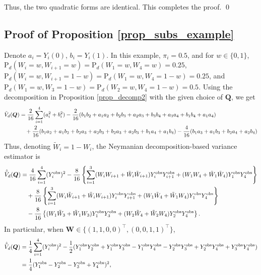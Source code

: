 \documentclass[12pt]{article}
\renewcommand{\Pr}{{\text{P}}}
\begin{document}
Thus, the two quadratic forms are identical. This completes the proof.
\qed
\subsection{Proof of Proposition \ref{prop_subs_example}}

Denote $a_i = Y_i(0)$, $b_i = Y_i(1)$. In this example, $\pi_i = 0.5$, and for $w \in \{0,1\}$, $\Pr_d(W_i = w, W_{i+1} = w) = \Pr_d(W_1 = w, W_4 = w) = 0.25$, $\Pr_d(W_{i} = w, W_{i+1} = 1-w) = \Pr_d(W_1 = w, W_4 = 1-w) = 0.25$, and $\Pr_d(W_1 = w, W_3 = 1-w) = \Pr_d(W_2 = w, W_4 = 1-w) = 0.5$. 
Using the decomposition in Proposition \ref{prop_decomp2} with the given choice of $\bm{Q}$, we get
\begin{align}
\Tilde{V}_d(\bm{Q}) &= \frac{2}{16}\sum_{i=1}^{4}(a^2_i + b^2_i) - \frac{2}{16}(b_1b_2+a_1a_2+b_2b_3+a_2a_3+b_3b_4+a_3a_4+b_1b_4+a_1a_4) \nonumber\\
& \quad + \frac{2}{16}(b_1a_2+a_1b_2+b_2a_3+a_2b_3+b_2a_3+a_2b_3+b_1a_4+a_1b_4) - \frac{4}{16}(b_1a_3 + a_1b_3 + b_2a_4 + a_2b_4)
\end{align}
Thus, denoting $\tilde{W}_i = 1 - W_i$, the Neymanian decomposition-based variance estimator is
\begin{align}
\hat{\Tilde{V}}_d(\bm{Q}) &= \frac{4}{16}\sum_{i=1}^{4}(Y^{\text{obs}}_i)^2 - \frac{8}{16}\left\{\sum_{i=1}^{3}(W_iW_{i+1} + \Tilde{W}_i\Tilde{W}_{i+1})Y^{\text{obs}}_iY^{\text{obs}}_{i+1} + (W_1W_4 + \Tilde{W}_1\Tilde{W}_4)Y^{\text{obs}}_1Y^{\text{obs}}_4 \right\} \nonumber\\
& \quad + \frac{8}{16}\left\{\sum_{i=1}^{3}(W_i\tilde{W}_{i+1} + \Tilde{W}_i {W}_{i+1})Y^{\text{obs}}_iY^{\text{obs}}_{i+1} + (W_1\tilde{W}_4 + \Tilde{W}_1{W}_4)Y^{\text{obs}}_1Y^{\text{obs}}_4 \right\} \nonumber\\
& \quad - \frac{8}{16} \left\{(W_1\tilde{W}_3 + \Tilde{W}_1{W}_3)Y^{\text{obs}}_1Y^{\text{obs}}_3 + (W_2\tilde{W}_4 + \Tilde{W}_2{W}_4)Y^{\text{obs}}_2Y^{\text{obs}}_4 \right\}.
\end{align}
In particular, when $\bm{W} \in \{(1,1,0,0)^\top, (0,0,1,1)^\top\}$, 
\begin{align}
    \hat{\Tilde{V}}_d(\bm{Q}) &= \frac{1}{4}\sum_{i=1}^{4}(Y^{\text{obs}}_i)^2 - \frac{1}{2}(Y^{\text{obs}}_1Y^{\text{obs}}_2 + Y^{\text{obs}}_1Y^{\text{obs}}_3 - Y^{\text{obs}}_1Y^{\text{obs}}_4 - Y^{\text{obs}}_2Y^{\text{obs}}_3 + Y^{\text{obs}}_2Y^{\text{obs}}_4 + Y^{\text{obs}}_3Y^{\text{obs}}_4) \nonumber \\
    & = \frac{1}{4} (Y^{\text{obs}}_1-Y^{\text{obs}}_2-Y^{\text{obs}}_3+Y^{\text{obs}}_4)^2, \label{eq_A_examp_1}
\end{align}
\end{document}
